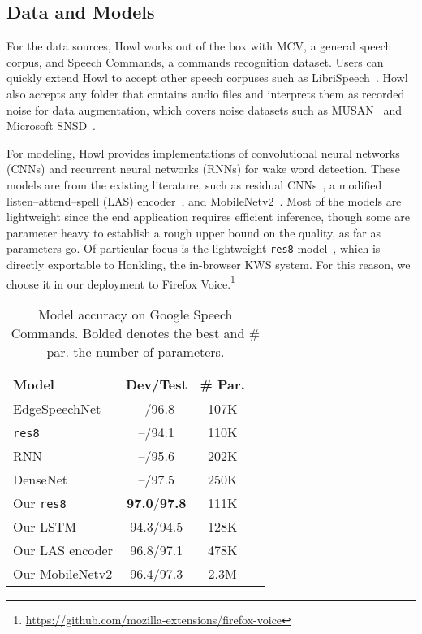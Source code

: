 \documentclass[11pt,a4paper]{article}
\begin{document}
\subsection{Data and Models}
For the data sources, Howl works out of the box with MCV, a general speech corpus, and Speech Commands, a commands recognition dataset.
Users can quickly extend Howl to accept other speech corpuses such as LibriSpeech~\cite{panayotov2015librispeech}.
Howl also accepts any folder that contains audio files and interprets them as recorded noise for data augmentation, which covers noise datasets such as MUSAN~\cite{snyder2015musan} and Microsoft SNSD~\cite{reddy2019scalable}.

For modeling, Howl provides implementations of convolutional neural networks (CNNs) and recurrent neural networks (RNNs) for wake word detection.
These models are from the existing literature, such as residual CNNs~\cite{tang2018deep}, a modified listen--attend--spell (LAS) encoder~\cite{chan2015listen, park2019specaugment}, and MobileNetv2~\cite{sandler2018mobilenetv2}.
Most of the models are lightweight since the end application requires efficient inference, though some are parameter heavy to establish a rough upper bound on the quality, as far as parameters go.
Of particular focus is the lightweight \texttt{res8} model~\cite{tang2018deep}, which is directly exportable to Honkling, the in-browser KWS system.
For this reason, we choose it in our deployment to Firefox Voice.\footnote{\url{https://github.com/mozilla-extensions/firefox-voice}}




\begin{table}[t]
    \centering
    \setlength{\tabcolsep}{1pt}
    \begin{tabular}{l c c c}
        \toprule[1pt]
        Model & Dev/Test & \# Par. \\
        \midrule 
        EdgeSpeechNet~\cite{lin2018edgespeechnets} & --/96.8 & 107K \\
        \texttt{res8}~\cite{tang2018deep} & --/94.1 & 110K \\
        RNN~\cite{de2018neural} & --/95.6 & 202K \\
        DenseNet~\cite{zeng2019effective} & --/97.5 & 250K \\
        \midrule
        Our \texttt{res8} & {\bf 97.0}/\textbf{97.8} & 111K\\
        Our LSTM & 94.3/94.5 & 128K\\
        Our LAS encoder & 96.8/97.1 & 478K\\
        Our MobileNetv2 & 96.4/97.3 & 2.3M\\
        \bottomrule[1pt]
    \end{tabular}
    \caption{Model accuracy on Google Speech Commands. Bolded denotes the best and \# par. the number of parameters.}
    \label{table:gsc-results}
\end{table}
\end{document}
